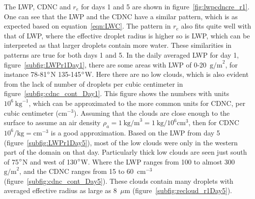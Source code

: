 The LWP, CDNC and $r_e$ for days 1 and 5 are shown in figure~\ref{fig:lwpcdncre_r1}. One can see that the LWP and the CDNC have a similar pattern, which is as expected based on equation~\ref{eqn:LWC}. The pattern in $r_e$ also fits quite well with that of LWP, where the effective droplet radius is higher so is LWP, which can be interpreted as that larger droplets contain more water. These similarities in patterns are true for both days 1 and 5. In the daily averaged LWP for day 1, figure~\ref{subfig:LWPr1Day1}, there are some areas with LWP of 0-20~$\text{g/m}^2$, for instance 78-81$\degree$N 135-145$\degree$W. Here there are no low clouds, which is also evident from the lack of number of droplets per cubic centimeter in figure~\ref{subfig:cdnc_cont_Day1}. This figure shows the numbers with units $10^6~\text{kg}^{-1}$, which can be approximated to the more common units for CDNC, per cubic centimeter ($\text{cm}^{-3}$). Assuming that the clouds are close enough to the surface to assume an air density $\rho_a = 1~\text{kg/m}^3=1~\text{kg/}10^6\text{cm}^3$, then for CDNC $10^6/\text{kg} = \text{cm}^{-3}$ is a good approximation.
Based on the LWP from day 5 (figure~\ref{subfig:LWPr1Day5}), most of the low clouds were only in the western part of the domain on that day. Particularly thick low clouds are seen just south of 75$\degree$N and west of 130$\degree$W. Where the LWP ranges from 100 to almost 300~$\text{g/m}^2$, and the CDNC ranges from 15 to 60~$\text{cm}^{-3}$ (figure~\ref{subfig:cdnc_cont_Day5}). These clouds contain many droplets with averaged effective radius as large as 8~$\mu\text{m}$ (figure~\ref{subfig:recloud_r1Day5}).

